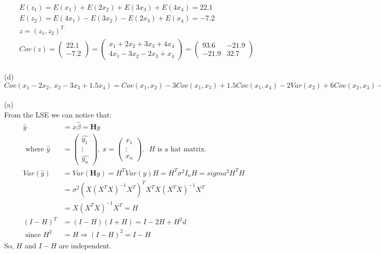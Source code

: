\documentclass[11pt]{article}
\begin{document}
  \begin{align*}
    &E(z_1) = E(x_1) + E(2x_2) + E(3x_3) + E(4x_4) = 22.1 \\
    &E(z_2) = E(4x_1) - E(3x_2) - E(2x_3) + E(x_4) = -7.2 \\
    &z = (z_1,z_2)^T \\
    &Cov(z) =
    \begin{pmatrix}
      22.1 \\ -7.2 \end{pmatrix}
      =
    \begin{pmatrix}
      x_1 + 2x_2 + 3x_3 + 4x_4 \\
      4x_1 - 3x_2 - 2x_3 + x_4
    \end{pmatrix}
    =
    \begin{pmatrix}
      93.6 & -21.9 \\
      -21.9 & 32.7
    \end{pmatrix}
  \end{align*}
  \\
  (d) \\
  $Cov(x_1 - 2x_2,\ x_2 - 3x_3 + 1.5x_4) = Cov(x_1, x_2)-3Cov(x_1,x_3) + 1.5Cov(x_1,x_4) - 2Var(x_2) + 6Cov(x_2,x_3)-3Cov(x_2,x_4) = -2.45$
  \\
  \paragraph{\color{red}{Question Eight Answer:}}(a)\\
  From the LSE we can notice that: \\
  \begin{align*}
    \hat{y} &= x \hat{\beta} = \mathbf{H}y \\
    \text{ where }\hat{y} &= \begin{pmatrix}\hat{y_1} \\ \vdots \\ \hat{y_n}\end{pmatrix},\ x = \begin{pmatrix}x_1 \\ \vdots\\ x_n\end{pmatrix}. \text{ $H$ is a hat matrix.}\\
    Var(\hat{y}) &= Var(\mathbf{H}y) = H^T Var(y)H = H^T \sigma^2I_nH =sigma^2 H^T H \\
    &= \sigma^2(X(X^TX)^{-1}X^T)^TX^TX(X^TX)^{-1}X^T \\
    &= X(X^TX)^{-1}X^T = H \\
    (I-H)^T &= (I-H)(I+H) = I -2H + H^2d\\
    \text{ since } H^2 &= H \Rightarrow (I-H)^2 = I-H
  \end{align*}
  So, $H$ and $I-H$ are independent.
  \\
\end{document}
